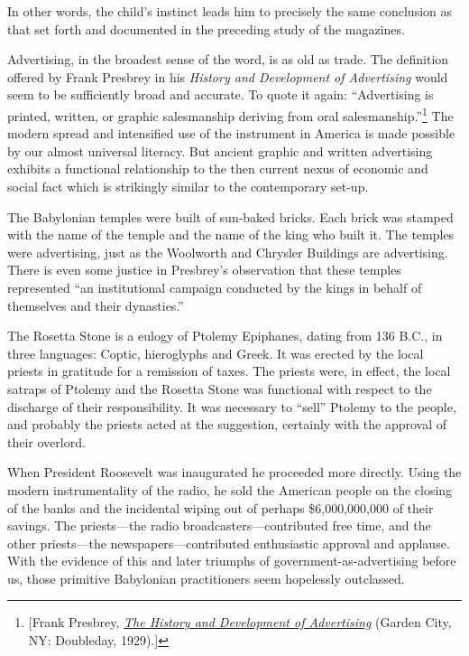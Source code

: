 \documentclass[twoside,nohyper,openany,nobib]{tufte-book}
\begin{document}
In other words, the child's instinct leads him to precisely the same
conclusion as that set forth and documented in the preceding study of
the magazines.

Advertising, in the broadest sense of the word, is as old as trade. The
definition offered by Frank Presbrey in his \emph{History and
Development of Advertising} would seem to be sufficiently broad and
accurate. To quote it again: ``Advertising is printed, written, or
graphic salesmanship deriving from oral salesmanship.''\footnote{{[}Frank Presbrey,
  \emph{\href{http://www.worldcat.org/oclc/700109}{The History and
  Development of Advertising}} (Garden City, NY: Doubleday, 1929).{]}} The modern
spread and intensified use of the instrument in America is made possible
by our almost universal literacy. But ancient graphic and written
advertising exhibits a functional relationship to the then current nexus
of economic and social fact which is strikingly similar to the
contemporary set-up.

The Babylonian temples were built of sun-baked bricks. Each brick was
stamped with the name of the temple and the name of the king who built
it. The temples were advertising, just as the Woolworth and Chrysler
Buildings are advertising. There is even some justice in Presbrey's
observation that these temples represented ``an institutional campaign
conducted by the kings in behalf of themselves and their dynasties.''

The Rosetta Stone is a eulogy of Ptolemy Epiphanes, dating from 136
B.C., in three languages: Coptic, hieroglyphs and Greek. It was erected
by the local priests in gratitude for a remission of taxes. The priests
were, in effect, the local satraps of Ptolemy and the Rosetta Stone was
functional with respect to the discharge of their responsibility. It was
necessary to ``sell'' Ptolemy to the people, and probably the priests
acted at the suggestion, certainly with the approval of their overlord.

When President Roosevelt was inaugurated he proceeded more directly.
Using the modern instrumentality of the radio, he sold the American
people on the closing of the banks and the incidental wiping out of
perhaps \$6,000,000,000 of their savings. The priests---the radio
broadcasters---contributed free time, and the other priests---the
newspapers---contributed enthusiastic approval and applause. With the
evidence of this and later triumphs of government-as-advertising before
us, those primitive Babylonian practitioners seem hopelessly outclassed.
\end{document}
